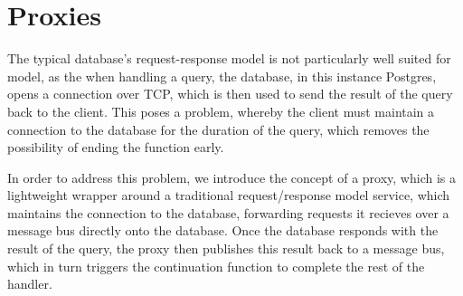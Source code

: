 \section{Proxies}
The typical database's request-response model is not particularly well suited for \faaas{} model, as the when handling a query, the database, in this instance Postgres, opens a connection over TCP, which is then used to send the result of the query back to the client. This poses a problem, whereby the client must maintain a connection to the database for the duration of the query, which removes the possibility of ending the function early.

In order to address this problem, we introduce the concept of a proxy, which is a lightweight wrapper around a traditional request/response model service, which maintains the connection to the database, forwarding requests it recieves over a message bus directly onto the database. Once the database responds with the result of the query, the proxy then publishes this result back to a message bus, which in turn triggers the continuation function to complete the rest of the handler.

